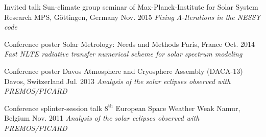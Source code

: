 

\begin{cventries}

  \cventry
    {Invited talk} %
    {Sun-climate group seminar of Max-Planck-Institute for Solar System Research} %
    {MPS, G{\"o}ttingen, Germany} %
    {Nov. 2015} %
    {\textit{Fixing $\Lambda$-Iterations in the NESSY code}} %

  \cventry
    {Conference poster} %
    {Solar Metrology: Needs and Methods} %
    {Paris, France} %
    {Oct. 2014} %
    {\textit{Fast NLTE radiative transfer numerical scheme for solar spectrum modeling}} %

  \cventry
    {Conference poster} %
    {Davos Atmosphere and Cryosphere Assembly (DACA-13)} %
    {Davos, Switzerland} %
    {Jul. 2013} %
    {\textit{Analysis of the solar eclipses observed with PREMOS/PICARD}} %

  \cventry
    {Conference splinter-session talk} %
    {$8^\mathrm{th}$ European Space Weather Weak} %
    {Namur, Belgium} %
    {Nov. 2011} %
    {\textit{Analysis of the solar eclipses observed with PREMOS/PICARD}} %

\end{cventries}
